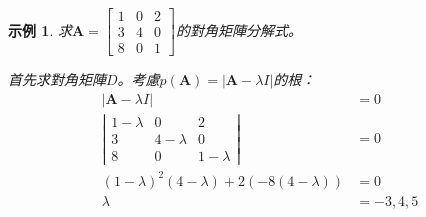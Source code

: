 \documentclass[12pt]{article}
\newtheorem*{example}{示例}
\begin{document}
    \begin{example}
        求$\mathbf{A}=\begin{bmatrix}
            1&0&2\\3&4&0\\8&0&1
        \end{bmatrix}$的對角矩陣分解式。

        首先求對角矩陣$D$。考慮$p(\mathbf{A})=|\mathbf{A}-\lambda I|$的根：\begin{align*}
            |\mathbf{A}-\lambda I|&=0\\
            \left|\begin{matrix}
                1-\lambda&0&2\\3&4-\lambda&0\\8&0&1-\lambda
            \end{matrix}\right|&=0\\
            (1-\lambda)^2(4-\lambda)+2(-8(4-\lambda))&=0\\
            \lambda&=-3,4,5
        \end{align*}


\end{example}
\end{document}
